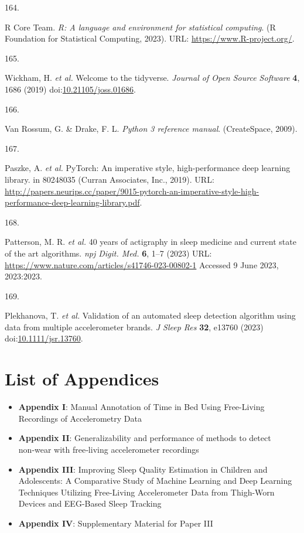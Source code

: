 \documentclass[
  10pt,
]{scrbook}
\newlength{\cslhangindent}
\newlength{\csllabelwidth}
\newlength{\cslentryspacingunit} %
\newenvironment{CSLReferences}[2] %
 {%
  \setlength{\parindent}{0pt}
  \ifodd #1
  \let\oldpar\par
  \def\par{\hangindent=\cslhangindent\oldpar}
  \fi
  \setlength{\parskip}{#2\cslentryspacingunit}
 }%
 {}
\newcommand{\CSLLeftMargin}[1]{\parbox[t]{\csllabelwidth}{#1}}
\newcommand{\CSLRightInline}[1]{\parbox[t]{\linewidth - \csllabelwidth}{#1}\break}
\begin{document}
\begin{CSLReferences}{0}{0}
\leavevmode{}%
\CSLLeftMargin{164. }%
\CSLRightInline{R Core Team. \emph{R: A language and environment for
statistical computing}. (R Foundation for Statistical Computing, 2023).
URL: \url{https://www.R-project.org/}.}

\leavevmode{}%
\CSLLeftMargin{165. }%
\CSLRightInline{Wickham, H. \emph{et al.} Welcome to the tidyverse.
\emph{Journal of Open Source Software} \textbf{4}, 1686 (2019)
doi:\href{https://doi.org/10.21105/joss.01686}{10.21105/joss.01686}.}

\leavevmode{}%
\CSLLeftMargin{166. }%
\CSLRightInline{Van Rossum, G. \& Drake, F. L. \emph{Python 3 reference
manual}. (CreateSpace, 2009).}

\leavevmode{}%
\CSLLeftMargin{167. }%
\CSLRightInline{Paszke, A. \emph{et al.} PyTorch: An imperative style,
high-performance deep learning library. in 80248035 (Curran Associates,
Inc., 2019). URL:
\url{http://papers.neurips.cc/paper/9015-pytorch-an-imperative-style-high-performance-deep-learning-library.pdf}.}

\leavevmode{}%
\CSLLeftMargin{168. }%
\CSLRightInline{Patterson, M. R. \emph{et al.} 40 years of actigraphy in
sleep medicine and current state of the art algorithms. \emph{npj Digit.
Med.} \textbf{6}, 1--7 (2023) URL:
\url{https://www.nature.com/articles/s41746-023-00802-1} Accessed 9 June
2023, 2023:2023.}

\leavevmode{}%
\CSLLeftMargin{169. }%
\CSLRightInline{Plekhanova, T. \emph{et al.} Validation of an automated
sleep detection algorithm using data from multiple accelerometer brands.
\emph{J Sleep Res} \textbf{32}, e13760 (2023)
doi:\href{https://doi.org/10.1111/jsr.13760}{10.1111/jsr.13760}.}

\end{CSLReferences}

\hypertarget{list-of-appendices}{%
\chapter{List of Appendices}\label{list-of-appendices}}

\begin{itemize}
\item
  \textbf{Appendix I}: Manual Annotation of Time in Bed Using
  Free-Living Recordings of Accelerometry Data
\item
  \textbf{Appendix II}: Generalizability and performance of methods to
  detect non‑wear with free‑living accelerometer recordings
\item
  \textbf{Appendix III}: Improving Sleep Quality Estimation in Children
  and Adolescents: A Comparative Study of Machine Learning and Deep
  Learning Techniques Utilizing Free-Living Accelerometer Data from
  Thigh-Worn Devices and EEG-Based Sleep Tracking
\item
  \textbf{Appendix IV}: Supplementary Material for Paper III
\end{itemize}
\end{document}
